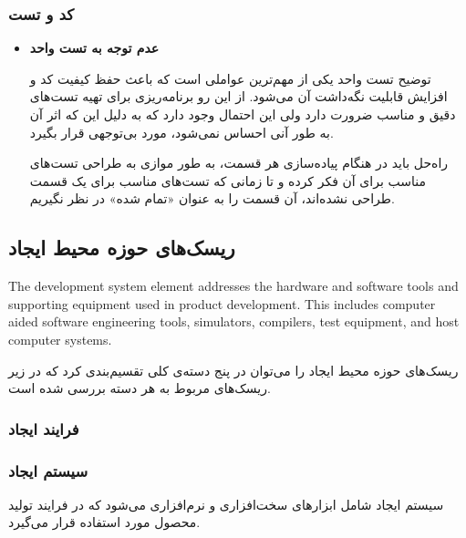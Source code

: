 \subsubsection{کد و تست}



\begin{itemize}
	
	
	\item 
	\textbf{عدم توجه به تست واحد}
	
	
	توضیح \hspace*{1cm} 
تست واحد یکی از مهم‌ترین عواملی است که باعث حفظ کیفیت کد و افزایش قابلیت نگه‌داشت آن می‌شود. از این رو برنامه‌ریزی برای تهیه تست‌های دقیق و مناسب ضرورت دارد ولی این احتمال وجود دارد که به دلیل این که اثر آن به طور آنی احساس نمی‌شود، مورد بی‌توجهی قرار بگیرد.
	
	راه‌حل \hspace*{1cm} 
باید در هنگام پیاده‌سازی هر قسمت، به طور موازی به طراحی تست‌های مناسب برای آن فکر کرده و تا زمانی که تست‌های مناسب برای یک قسمت طراحی نشده‌اند، آن قسمت را به عنوان «تمام شده»‌ در نظر نگیریم.
	
	
	
	
\end{itemize}

\subsection{ریسک‌های حوزه محیط ایجاد}

The development system element addresses the hardware and software tools and supporting
equipment used in product development. This includes computer aided software engineering
tools, simulators, compilers, test equipment, and host computer systems.


ریسک‌های حوزه محیط ایجاد را می‌توان در پنج دسته‌ی کلی تقسیم‌بندی کرد که در زیر ریسک‌های مربوط به هر دسته بررسی شده است.

\subsubsection{فرایند ایجاد}


\subsubsection{سیستم ایجاد}

سیستم ایجاد شامل ابزارهای سخت‌افزاری و نرم‌افزاری می‌شود که در فرایند تولید محصول مورد استفاده قرار می‌گیرد.

